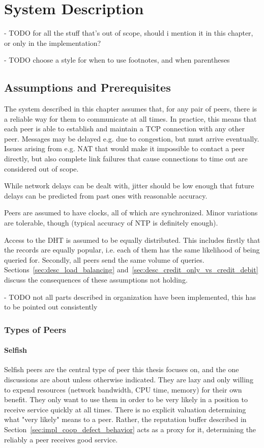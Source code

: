 \chapter{System Description}
\label{chap:system_description}
- TODO for all the stuff that's out of scope, should i mention it in this
  chapter, or only in the implementation?

- TODO choose a style for when to use footnotes, and when parentheses

\section{Assumptions and Prerequisites}
The system described in this chapter assumes that, for any pair of peers, there
is a reliable way for them to communicate at all times. In practice, this means
that each peer is able to establish and maintain a TCP connection with any other
peer. Messages may be delayed e.g. due to congestion, but must arrive
eventually. Issues arising from e.g. NAT that would make it impossible to
contact a peer directly, but also complete link failures that cause connections
to time out are considered out of scope.

While network delays can be dealt with, jitter should be low enough that future
delays can be predicted from past ones with reasonable accuracy.

Peers are assumed to have clocks, all of which are synchronized. Minor
variations are tolerable, though (typical accuracy of NTP is definitely enough).

Access to the \ac{DHT} is assumed to be equally distributed. This includes
firstly that the records are equally popular, i.e. each of them has the same
likelihood of being queried for. Secondly, all peers send the same volume of
queries. Sections~\ref{sec:desc_load_balancing}
and~\ref{sec:desc_credit_only_vs_credit_debit} discuss the consequences of these
assumptions not holding.

- TODO not all parts described in organization have been implemented, this has
  to be pointed out consistently

\subsection{Types of Peers}
\subsubsection{Selfish}
Selfish peers are the central type of peer this thesis focuses on, and the one
discussions are about unless otherwise indicated. They are lazy and only willing
to expend resources (network bandwidth, CPU time, memory) for their own benefit.
They only want to use them in order to be very likely in a position to receive
service quickly at all times. There is no explicit valuation determining what
"very likely" means to a peer. Rather, the reputation buffer described in
Section~\ref{sec:impl_coop_defect_behavior} acts as a proxy for it, determining
the reliably a peer receives good service.


